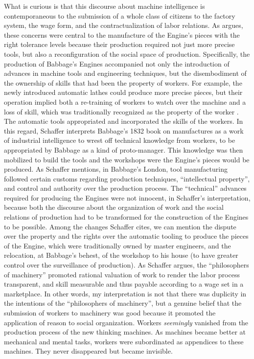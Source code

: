 \documentclass[version=last,draft=false,paper=A4,portrait,twoside=true,twocolumn=false,headinclude=false,footinclude=false,mpinclude=true,fontsize=12,BCOR=20mm,DIV=calc,pagesize=auto,open=right,chapterprefix=true,numbers=autoendperiod,headsepline=false,headings=twolinechapter,parskip=false]{scrbook}
\begin{document}
What is curious is that this discourse about machine intelligence is
contemporaneous to the submission of a whole class of citizens to the
factory system, the wage form, and the contractualization of labor
relations. As \textcite{schaffer1994} argues, these concerns were central to
the manufacture of the Engine's pieces with the right tolerance levels
because their production required not just more precise tools, but also a
reconfiguration of the social space of production. Specifically, the
production of Babbage's Engines accompanied not only the introduction of
advances in machine tools and engineering techniques, but the disembodiment
of the ownership of skills that had been the property of workers. For
example, the newly introduced automatic lathes could produce more precise
pieces, but their operation implied both a re-training of workers to watch
over the machine and a loss of skill, which was traditionally recognized as
the property of the worker \autocite[p. 214]{schaffer1994}. The automatic
tools appropriated and incorporated the skills of the workers. In this
regard, Schaffer interprets Babbage's 1832 book on manufactures as a work
of industrial intelligence to wrest off technical knowledge from workers,
to be appropriated by Babbage as a kind of proto-manager. This knowledge
was then mobilized to build the tools and the workshops were the Engine's
pieces would be produced. As Schaffer mentions, in Babbage's London, tool
manufacturing followed certain customs regarding production techniques,
``intellectual property'', and control and authority over the production
process. The ``technical'' advances required for producing the Engines were
not innocent, in Schaffer's interpretation, because both the discourse
about the organization of work and the social relations of production had
to be transformed for the construction of the Engines to be possible. Among
the changes Schaffer cites, we can mention the dispute over the property
and the rights over the automatic tooling to produce the pieces of the
Engine, which were traditionally owned by master engineers, and the
relocation, at Babbage's behest, of the workshop to his house (to have
greater control over the surveillance of production). As Schaffer argues,
the ``philosophers of machinery'' promoted rational valuation of work to
render the labor process transparent, and skill measurable and thus payable
according to a wage set in a marketplace. In other words, my interpretation
is not that there was duplicity in the intentions of the ``philosophers of
machinery'', but a genuine belief that the submission of workers to
machinery was good because it promoted the application of reason to social
organization. Workers \emph{seemingly} vanished from the production process of the
new thinking machines. As machines became better at mechanical and mental
tasks, workers were subordinated as appendices to these machines. They
never disappeared but became invisible.
\end{document}
